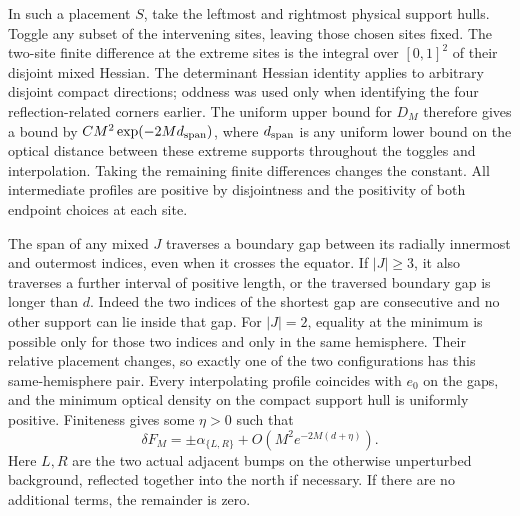 \documentclass[11pt,letterpaper]{article}
\begin{document}
In such a placement \(S\), take the leftmost and rightmost physical
support hulls. Toggle any subset of the intervening sites, leaving
those chosen sites fixed. The two-site finite difference at the
extreme sites is the integral over \([0,1]^2\) of their disjoint
mixed Hessian. The determinant Hessian identity applies to arbitrary
disjoint compact directions; oddness was used only when identifying
the four reflection-related corners earlier. The uniform upper bound
for \(D_M\) therefore gives a bound by \(CM^2\exp(-2M d_{\rm span})\),
where \(d_{\rm span}\) is any uniform lower bound on the optical
distance between these extreme supports throughout the toggles and
interpolation. Taking the remaining finite differences changes the
constant. All intermediate profiles are positive by disjointness and
the positivity of both endpoint choices at each site.

The span of any mixed \(J\) traverses a boundary gap between its
radially innermost and outermost indices, even when it crosses the
equator. If \(|J|\geq3\), it also traverses a further interval of
positive length, or the traversed boundary gap is longer than \(d\).
Indeed the two indices of the shortest gap are consecutive and
no other support can lie inside that gap. For \(|J|=2\), equality
at the minimum is possible only for those two indices and only in
the same hemisphere. Their relative placement changes, so exactly
one of the two configurations has this same-hemisphere pair.
Every interpolating profile coincides with \(e_0\) on the gaps, and
the minimum optical density on the compact support hull is uniformly
positive. Finiteness gives some \(\eta>0\) such that
\[
 \delta F_M=\pm\alpha_{\{L,R\}}+O(M^2e^{-2M(d+\eta)}).
\]
Here \(L,R\) are the two actual adjacent bumps on the otherwise
unperturbed background, reflected together into the north if necessary.
If there are no additional terms, the remainder is zero.
\end{document}
